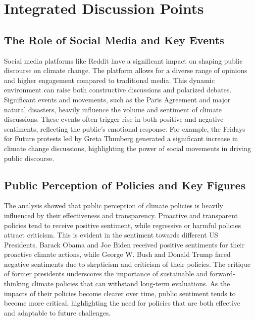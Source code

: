 \section{Integrated Discussion Points}
\subsection{The Role of Social Media and Key Events}
Social media platforms like Reddit have a significant impact on shaping public discourse on climate change. The platform allows for a diverse range of opinions and higher engagement compared to traditional media. This dynamic environment can raise both constructive discussions and polarized debates. Significant events and movements, such as the Paris Agreement and major natural disasters, heavily influence the volume and sentiment of climate discussions. These events often trigger rise in both positive and negative sentiments, reflecting the public's emotional response. For example, the Fridays for Future protests led by Greta Thunberg generated a significant increase in climate change discussions, highlighting the power of social movements in driving public discourse.

\subsection{Public Perception of Policies and Key Figures}
The analysis showed that public perception of climate policies is heavily influenced by their effectiveness and transparency. Proactive and transparent policies tend to receive positive sentiment, while regressive or harmful policies attract criticism. This is evident in the sentiment towards different US Presidents. Barack Obama and Joe Biden received positive sentiments for their proactive climate actions, while George W. Bush and Donald Trump faced negative sentiments due to skepticism and criticism of their policies. The critique of former presidents underscores the importance of sustainable and forward-thinking climate policies that can withstand long-term evaluations. As the impacts of their policies become clearer over time, public sentiment tends to become more critical, highlighting the need for policies that are both effective and adaptable to future challenges.

